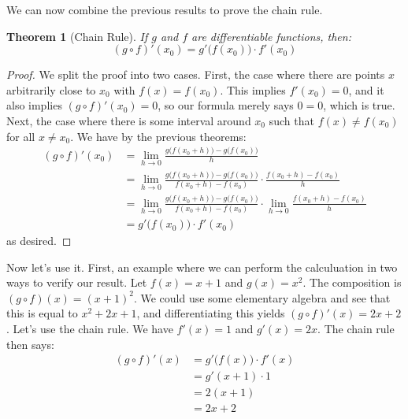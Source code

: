 \documentclass{article}
\theoremstyle{plain}
\newtheorem{theorem}{Theorem}
\begin{document}
    We can now combine the previous results to prove the chain rule.
    \begin{theorem}[Chain Rule]
        If $g$ and $f$ are differentiable functions, then:
        \begin{equation}
            (g\circ{f})'(x_{0})=g'\big(f(x_{0})\big)\cdot{f}'(x_{0})
        \end{equation}
    \end{theorem}
    \begin{proof}
        We split the proof into two cases. First, the case where there are
        points $x$ arbitrarily close to $x_{0}$ with $f(x)=f(x_{0})$. This
        implies $f'(x_{0})=0$, and it also implies
        $(g\circ{f})'(x_{0})=0$, so our formula merely says $0=0$,
        which is true. Next, the case where there is some interval around
        $x_{0}$ such that $f(x)\ne{f}(x_{0})$ for all $x\ne{x}_{0}$. We have
        by the previous theorems:
        \begin{align}
            (g\circ{f})'(x_{0})
            &=\lim_{h\rightarrow{0}}
            \frac{g\big(f(x_{0}+h)\big)-g\big(f(x_{0})\big)}{h}\\
            &=\lim_{h\rightarrow{0}}
            \frac{g\big(f(x_{0}+h)\big)-g\big(f(x_{0})\big)}
                 {f(x_{0}+h)-f(x_{0})}
            \cdot\frac{f(x_{0}+h)-f(x_{0})}{h}\\
            &=
            \lim_{h\rightarrow{0}}
            \frac{g\big(f(x_{0}+h)\big)-g\big(f(x_{0})\big)}
                 {f(x_{0}+h)-f(x_{0})}
            \cdot\lim_{h\rightarrow{0}}
            \frac{f(x_{0}+h)-f(x_{0})}{h}\\
            &=g'\big(f(x_{0})\big)\cdot{f}'(x_{0})
        \end{align}
        as desired.
    \end{proof}
    Now let's use it. First, an example where we can perform the calculuation
    in two ways to verify our result. Let $f(x)=x+1$ and $g(x)=x^2$. The
    composition is $(g\circ{f})(x)=(x+1)^{2}$. We could use some elementary
    algebra and see that this is equal to $x^{2}+2x+1$, and differentiating
    this yields $(g\circ{f})'(x)=2x+2$. Let's use the chain rule. We have
    $f'(x)=1$ and $g'(x)=2x$. The chain rule then says:
    \begin{align}
        (g\circ{f})'(x)
            &=g'\big(f(x)\big)\cdot{f}'(x)
                \tag{Chain Rule}\\
            &=g'(x+1)\cdot{1}
                \tag{Substitute $f$ and $f'$}\\
            &=2(x+1)
                \tag{Substitute $g'$}\\
            &=2x+2
                \tag{Simplify}
    \end{align}
\end{document}
